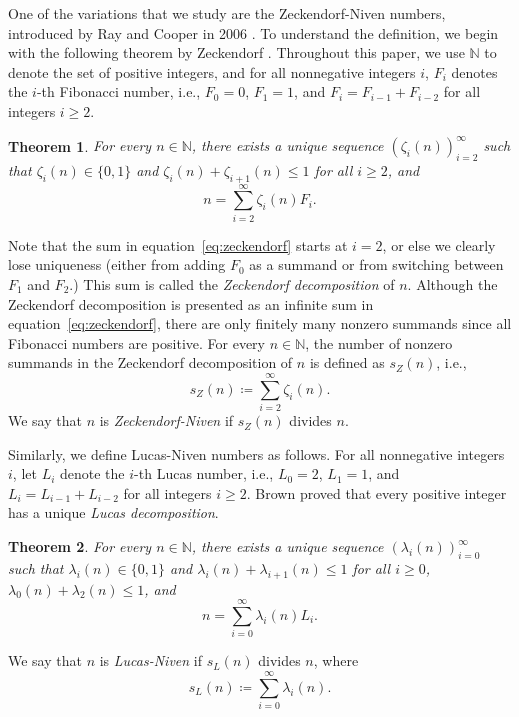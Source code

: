 \documentclass[12pt]{article}
\newtheorem{theorem}{Theorem}[section]
\theoremstyle{definition}
\newcommand{\N}{\mathbb{N}}
\begin{document}
One of the variations that we study are the Zeckendorf-Niven numbers, introduced by Ray and Cooper in 2006 \cite{rc}. To understand the definition, we begin with the following theorem by Zeckendorf \cite{zeckendorf}. Throughout this paper, we use $\N$ to denote the set of positive integers, and for all nonnegative integers $i$, $F_i$ denotes the $i$-th Fibonacci number, i.e., $F_0=0$, $F_1=1$, and $F_i=F_{i-1}+F_{i-2}$ for all integers $i\geq2$.

\begin{theorem}
For every $n\in\N$, there exists a unique sequence $(\zeta_i(n))_{i=2}^\infty$ such that $\zeta_i(n)\in\{0,1\}$ and $\zeta_i(n)+\zeta_{i+1}(n)\leq1$ for all $i\geq2$, and
\begin{equation}\label{eq:zeckendorf}
n=\sum_{i=2}^\infty\zeta_i(n)F_i.
\end{equation}
\end{theorem}

Note that the sum in equation~\eqref{eq:zeckendorf} starts at $i=2$, or else we clearly lose uniqueness (either from adding $F_0$ as a summand or from switching between $F_1$ and $F_2$.) This sum is called the \emph{Zeckendorf decomposition} of $n$. Although the Zeckendorf decomposition is presented as an infinite sum in equation~\eqref{eq:zeckendorf}, there are only finitely many nonzero summands since all Fibonacci numbers are positive. For every $n\in\N$, the number of nonzero summands in the Zeckendorf decomposition of $n$ is defined as $s_Z(n)$, i.e.,
\[s_Z(n)\coloneq\sum_{i=2}^\infty\zeta_i(n).\]
We say that $n$ is \emph{Zeckendorf-Niven} if $s_Z(n)$ divides $n$.

Similarly, we define Lucas-Niven numbers as follows. For all nonnegative integers $i$, let $L_i$ denote the $i$-th Lucas number, i.e., $L_0=2$, $L_1=1$, and $L_i=L_{i-1}+L_{i-2}$ for all integers $i\geq2$. Brown \cite{brown} proved that every positive integer has a unique \emph{Lucas decomposition}.

\begin{theorem}
For every $n\in\N$, there exists a unique sequence $(\lambda_i(n))_{i=0}^\infty$ such that $\lambda_i(n)\in\{0,1\}$ and $\lambda_i(n)+\lambda_{i+1}(n)\leq1$ for all $i\geq0$, $\lambda_0(n)+\lambda_2(n)\leq1$, and
\[n=\sum_{i=0}^\infty\lambda_i(n)L_i.\]
\end{theorem}

We say that $n$ is \emph{Lucas-Niven} if $s_L(n)$ divides $n$, where
\[s_L(n)\coloneq\sum_{i=0}^\infty\lambda_i(n).\]
\end{document}

